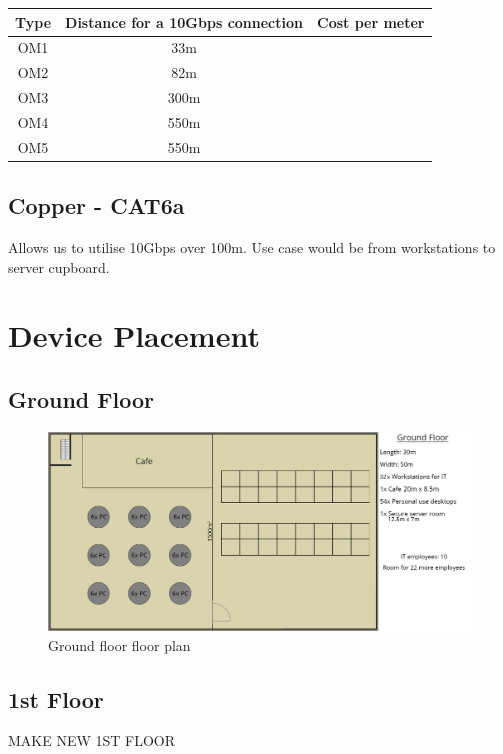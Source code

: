\begin{table}[]
    \centering
    \begin{tabular}{|c|c|c|}
    \hline
    Type & Distance for a 10Gbps connection & Cost per meter \\ \hline
    OM1  & 33m                              &                \\ \hline
    OM2  & 82m                              &                \\ \hline
    OM3  & 300m                             &                \\ \hline
    OM4  & 550m                             &                \\ \hline
    OM5  & 550m                             &                \\ \hline
    \end{tabular}
\end{table}
\subsection{Copper - CAT6a}
Allows us to utilise 10Gbps over 100m. Use case would be from workstations to server cupboard.
\section{Device Placement}
\subsection{Ground Floor}
\begin{figure}[!h]
    \includegraphics[width=15cm]{Figures/ground.png}
    \caption{Ground floor floor plan}
    \label{ground_floor}
\end{figure}
\subsection{1st Floor}
\begin{huge}
    MAKE NEW 1ST FLOOR
\end{huge}
